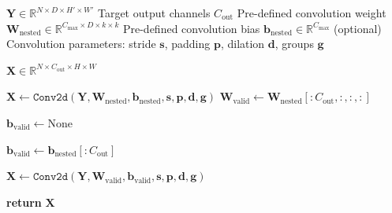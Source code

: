 \begin{algorithm}
\caption{Matryoshka Kernel Output Layer Forward Pass}
\label{alg:adaptive_output_conv_slice}
\begin{algorithmic}[1]

\REQUIRE
\INPUT $\mathbf{Y} \in \mathbb{R}^{N \times D \times H' \times W'}$
\INPUT Target output channels $C_{\text{out}}$
\INPUT Pre-defined convolution weight
$\mathbf{W}_{\text{nested}} \in \mathbb{R}^{C_{\text{max}} \times D \times k \times k}$
\INPUT Pre-defined convolution bias
$\mathbf{b}_{\text{nested}} \in \mathbb{R}^{C_{\text{max}}}$ (optional)
\INPUT Convolution parameters: stride $\mathbf{s}$, padding $\mathbf{p}$,
dilation $\mathbf{d}$, groups $\mathbf{g}$

\ENSURE
\OUTPUT $\mathbf{X} \in \mathbb{R}^{N \times C_{\text{out}} \times H \times W}$


    \STATE $\mathbf{X} \gets
    \texttt{Conv2d}(\mathbf{Y}, \mathbf{W}_{\text{nested}},
    \mathbf{b}_{\text{nested}}, \mathbf{s}, \mathbf{p}, \mathbf{d}, \mathbf{g})$
\ELSE
    \STATE $\mathbf{W}_{\text{valid}} \gets
    \mathbf{W}_{\text{nested}}[:C_{\text{out}}, :, :, :]$

    \STATE $\mathbf{b}_{\text{valid}} \gets \text{None}$

        \STATE $\mathbf{b}_{\text{valid}} \gets
        \mathbf{b}_{\text{nested}}[:C_{\text{out}}]$
    \ENDIF

    \STATE $\mathbf{X} \gets
    \texttt{Conv2d}(\mathbf{Y}, \mathbf{W}_{\text{valid}},
    \mathbf{b}_{\text{valid}}, \mathbf{s}, \mathbf{p}, \mathbf{d}, \mathbf{g})$
\ENDIF

\STATE \textbf{return} $\mathbf{X}$

\ENDFUNCTION

\end{algorithmic}
\end{algorithm}
